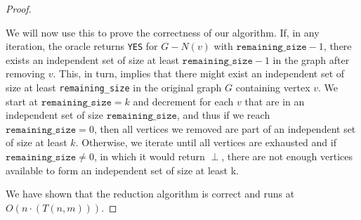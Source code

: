 \documentclass[11pt]{scrartcl}
\theoremstyle{dotlessP}
\theoremstyle{dotlessN}
\begin{document}
\begin{enumerate}[(a)]
\begin{proof}
\begin{itemize}
		We will now use this to prove the correctness of our algorithm. If, in any iteration, the oracle returns \texttt{YES} for $G - N(v)$ with $\texttt{remaining\_size} - 1$, there exists an independent set of size at least $\texttt{remaining\_size} - 1$ in the graph after removing $v$. This, in turn, implies that there might exist an independent set of size at least \texttt{remaining\_size} in the original graph $G$ containing vertex $v$. We start at $\texttt{remaining\_size} = k$ and decrement for each $v$ that are in an independent set of size $\texttt{remaining\_size}$, and thus if we reach  $\texttt{remaining\_size} = 0$, then all vertices we removed are part of an independent set of size at least $k$. Otherwise, we iterate until all vertices are exhausted and if $\texttt{remaining\_size} \neq 0$, in which it would return $\perp$, there are not enough vertices available to form an independent set of size at least k. 
\end{itemize}
We have shown that the reduction algorithm is correct and runs at $O(n\cdot(T(n,m)))$.
	\end{proof}
\end{enumerate}
\end{document}
